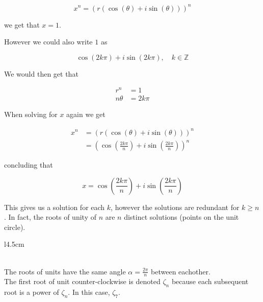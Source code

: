 \documentclass{article}
\begin{document}
\[
    x^n = \left(r\left(\cos(\theta) + i\sin(\theta)\right)\right)^n
\]

we get that \(x=1\).

However we could also write \(1\) as

\[
    \cos(2k\pi) + i\sin(2k\pi), \quad k\in \mathbb{Z}
\]

We would then get that

\begin{align*}
    r^n&=1 \\
    n\theta&=2k\pi
\end{align*}

When solving for \(x\) again we get

\begin{align*}
    x^n &= \left(r\left(\cos(\theta) + i\sin(\theta)\right)\right)^n
    \\
    &= \left(\cos\left(\frac{2k\pi}{n}\right) + i\sin\left(\frac{2k\pi}{n}\right)\right)^n
\end{align*}

concluding that

\[
    x = \cos\left(\frac{2k\pi}{n}\right) + i\sin\left(\frac{2k\pi}{n}\right)
\]

This gives us a solution for each \(k\), however the solutions are redundant for \(k \geq n\).
In fact, the roots of unity of \(n\) are \(n\) distinct solutions (points on the unit circle).

\def\n{7}
\begin{wrapfigure}[4]{l}{4.5cm} %
\end{wrapfigure}

\phantom{ }\\
    
The roots of units have the same angle \(\alpha = \frac{2\pi}{n}\) between eachother.
\\
The first root of unit counter-clockwise is denoted \(\zeta_n\) because each subsequent
root is a power of \(\zeta_n\). In this case, \(\zeta_\n\).
\end{document}

